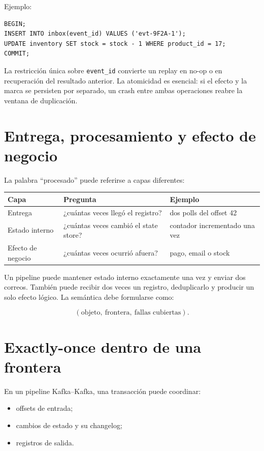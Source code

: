 \documentclass[variant=apuntes,cover=institutional,mode=screen]{ua-engineering-v6-article}
\begin{document}
Ejemplo:

\begin{verbatim}
BEGIN;
INSERT INTO inbox(event_id) VALUES ('evt-9F2A-1');
UPDATE inventory SET stock = stock - 1 WHERE product_id = 17;
COMMIT;
\end{verbatim}

La restricción única sobre \texttt{event\_id} convierte un replay en no-op o en recuperación del resultado anterior. La atomicidad es esencial: si el efecto y la marca se persisten por separado, un crash entre ambas operaciones reabre la ventana de duplicación.

\section{Entrega, procesamiento y efecto de negocio}

La palabra ``procesado'' puede referirse a capas diferentes:

\begin{center}
\begin{tabular}{p{}p{}p{}}
\toprule
Capa & Pregunta & Ejemplo \\
\midrule
Entrega & ¿cuántas veces llegó el registro? & dos polls del offset 42 \\
Estado interno & ¿cuántas veces cambió el state store? & contador incrementado una vez \\
Efecto de negocio & ¿cuántas veces ocurrió afuera? & pago, email o stock \\
\bottomrule
\end{tabular}
\end{center}

Un pipeline puede mantener estado interno exactamente una vez y enviar dos correos. También puede recibir dos veces un registro, deduplicarlo y producir un solo efecto lógico. La semántica debe formularse como:

\[
(\text{objeto},\ \text{frontera},\ \text{fallas cubiertas}).
\]

\section{Exactly-once dentro de una frontera}

En un pipeline Kafka--Kafka, una transacción puede coordinar:

\begin{itemize}
\item offsets de entrada;
\item cambios de estado y su changelog;
\item registros de salida.
\end{itemize}
\end{document}
